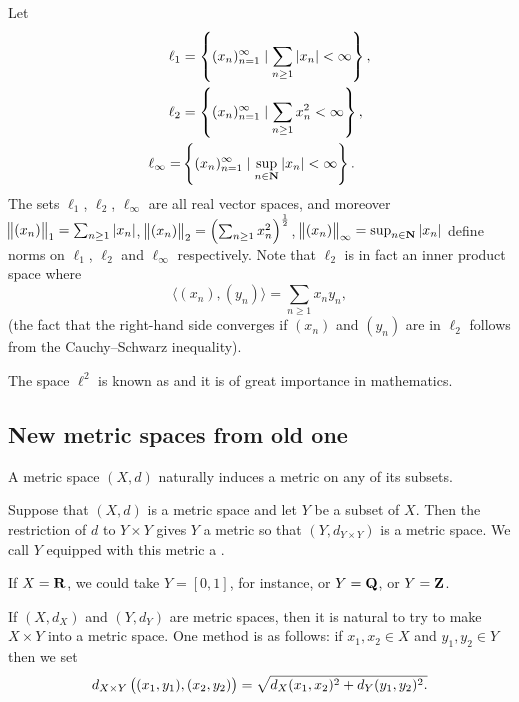\begin{example}
Let
\begin{align*}
\ell_1&=\left\{(x_n)_{n=1}^\infty\mid\sum_{n\ge1}|x_n|<\infty\right\},\\
\ell_2&=\left\{(x_n)_{n=1}^\infty\mid\sum_{n\ge1}x_n^2<\infty\right\},\\
\ell_\infty=&\left\{(x_n)_{n=1}^\infty\mid\sup_{n\in\mathbf N}|x_n|<\infty\right\}.
\end{align*}
The sets $\ell_1$, $\ell_2$, $\ell_\infty$ are all real vector spaces, and moreover $\norm{(x_n)}_1=\sum_{n\ge1}|x_n|$, $\norm{(x_n)}_2=\left(\sum_{n\ge1}x_n^2\right)^\frac{1}{2}$, $\norm{(x_n)}_\infty=\sup_{n\in\mathbf N}|x_n|$ define norms on $\ell_1$, $\ell_2$ and $\ell_\infty$ respectively. Note that $\ell_2$ is in fact an inner product space where
\[\langle(x_n),(y_n)\rangle=\sum_{n\ge1}x_ny_n,\]
(the fact that the right-hand side converges if $(x_n)$ and $(y_n)$ are in $\ell_2$ follows from the Cauchy--Schwarz inequality).

The space $\ell^2$ is known as  and it is of great importance in mathematics.
\end{example}

\subsection{New metric spaces from old one}
A metric space $(X,d)$ naturally induces a metric on any of its subsets.

\begin{definition}[Subspace]
Suppose that $(X, d)$ is a metric space and let $Y$ be a subset of $X$. Then the restriction of $d$ to $Y\times Y$ gives $Y$ a metric so that $(Y,d_{Y\times Y})$ is a metric space. We call $Y$ equipped with this metric a .
\end{definition}

\begin{example}
If $X=\mathbf R$, we could take $Y=[0,1]$, for instance, or $Y=\mathbf Q$, or $Y=\mathbf Z$.
\end{example}

\begin{definition}
If $(X,d_X)$ and $(Y,d_Y)$ are metric spaces, then it is natural to try to make $X\times Y$ into a metric space. One method is as follows: if $x_1,x_2\in X$ and $y_1,y_2\in Y$ then we set
\[d_{X\times Y}\left((x_1,y_1),(x_2,y_2)\right)=\sqrt{d_X(x_1,x_2)^2+d_Y(y_1,y_2)^2.}\]
\end{definition}


